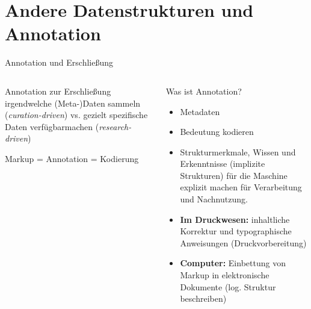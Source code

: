 

\section{Andere Datenstrukturen und Annotation}
\begin{frame}[fragile]{Annotation und Erschließung}

\begin{columns}

\begin{alertblock}{Annotation zur Erschließung}
\small 
irgendwelche (Meta-)Daten sammeln (\emph{curation-driven}) vs. gezielt spezifische Daten verfügbarmachen (\emph{research-driven})
\bigskip

Markup = Annotation = Kodierung 
\end{alertblock}

\begin{exampleblock}{Was ist Annotation?}
\begin{itemize}\footnotesize
\item Metadaten
\item Bedeutung kodieren 
\item Strukturmerkmale, Wissen und Erkenntnisse (implizite Strukturen) für die Maschine explizit machen für Verarbeitung und Nachnutzung. 
\item \textbf{Im Druckwesen:} inhaltliche Korrektur und typographische Anweisungen (Druckvorbereitung) 
\item \textbf{Computer:} Einbettung von Markup in elektronische Dokumente (log. Struktur beschreiben)
\end{itemize}
\end{exampleblock}

\end{columns}

\end{frame}


